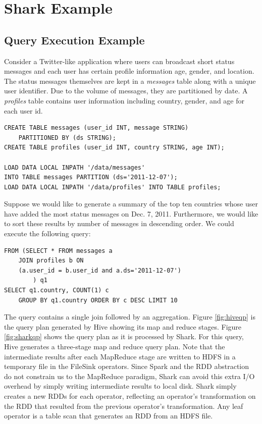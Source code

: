 
\section{Shark Example}

\subsection{Query Execution Example}

Consider a Twitter-like application where users can broadcast short status messages and each user has certain profile information \eg age, gender, and location. The status messages themselves are kept in a \emph{messages} table along with a unique user identifier. Due to the volume of messages, they are partitioned by date. A \emph{profiles} table contains user information including country, gender, and age for each user id. 

{\small
\begin{verbatim}
CREATE TABLE messages (user_id INT, message STRING) 
    PARTITIONED BY (ds STRING);
CREATE TABLE profiles (user_id INT, country STRING, age INT);

LOAD DATA LOCAL INPATH '/data/messages'
INTO TABLE messages PARTITION (ds='2011-12-07');
LOAD DATA LOCAL INPATH '/data/profiles' INTO TABLE profiles;
\end{verbatim}
}

Suppose we would like to generate a summary of the top ten countries whose user have added the most status messages on Dec. 7, 2011. Furthermore, we would like to sort these results by number of messages in descending order. We could execute the following query:

{\small
\begin{verbatim}
FROM (SELECT * FROM messages a 
    JOIN profiles b ON 
    (a.user_id = b.user_id and a.ds='2011-12-07')
        ) q1
SELECT q1.country, COUNT(1) c 
    GROUP BY q1.country ORDER BY c DESC LIMIT 10
\end{verbatim}
}

The query contains a single join followed by an aggregation. Figure \ref{fig:hiveqp} is the query plan generated by Hive showing its map and reduce stages. Figure \ref{fig:sharkqp} shows the query plan as it is processed by Shark. For this query, Hive generates a three-stage map and reduce query plan. Note that the intermediate results after each MapReduce stage are written to HDFS in a temporary file in the FileSink operators. Since Spark and the RDD abstraction do not constrain us to the MapReduce paradigm, Shark can avoid this extra I/O overhead by simply writing intermediate results to local disk. Shark simply creates a new RDDs for each operator, reflecting an operator's transformation on the RDD that resulted from the previous operator's transformation. Any leaf operator is a table scan that generates an RDD from an HDFS file. 

